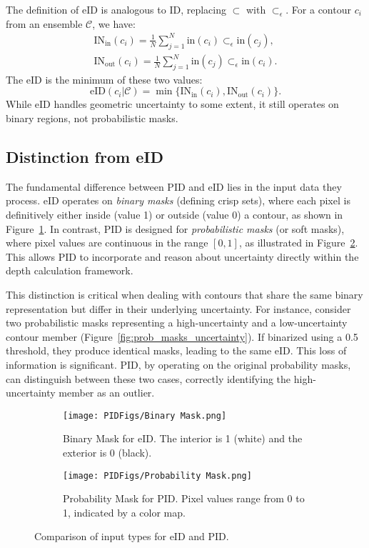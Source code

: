 \documentclass[review,journal]{vgtc}              %
\begin{document}
The definition of eID is analogous to ID, replacing $\subset$ with $\subset_{\epsilon}$. For a contour $c_i$ from an ensemble $\mathcal{C}$, we have:
\begin{gather}
\mathrm{IN_{in}}(c_i) = \frac{1}{N} \sum_{j=1}^{N} \mathrm{in}(c_i) \subset_{\epsilon} \mathrm{in}(c_j), \\
\mathrm{IN_{out}}(c_i) = \frac{1}{N} \sum_{j=1}^{N} \mathrm{in}(c_j) \subset_{\epsilon} \mathrm{in}(c_i).
\end{gather}
The eID is the minimum of these two values:
\begin{equation}
\mathrm{eID}(c_i|\mathcal{C}) = \min\{\mathrm{IN_{in}}(c_i), \mathrm{IN_{out}}(c_i)\}.
\end{equation}
While eID handles geometric uncertainty to some extent, it still operates on binary regions, not probabilistic masks.

\subsection{Distinction from eID}
The fundamental difference between PID and eID lies in the input data they process. eID operates on \emph{binary masks} (defining crisp sets), where each pixel is definitively either inside (value 1) or outside (value 0) a contour, as shown in Figure~\ref{fig:binary_mask}. In contrast, PID is designed for \emph{probabilistic masks} (or soft masks), where pixel values are continuous in the range $[0, 1]$, as illustrated in Figure~\ref{fig:prob_mask}. This allows PID to incorporate and reason about uncertainty directly within the depth calculation framework.

This distinction is critical when dealing with contours that share the same binary representation but differ in their underlying uncertainty. For instance, consider two probabilistic masks representing a high-uncertainty and a low-uncertainty contour member (Figure~\ref{fig:prob_masks_uncertainty}). If binarized using a 0.5 threshold, they produce identical masks, leading to the same eID. This loss of information is significant. PID, by operating on the original probability masks, can distinguish between these two cases, correctly identifying the high-uncertainty member as an outlier.

\begin{figure}[h!]
    \centering
    \begin{subfigure}[b]{0.45\textwidth}
        \centering
        \texttt{[image: PIDFigs/Binary Mask.png]}
        \caption{Binary Mask for eID. The interior is 1 (white) and the exterior is 0 (black).}
        \label{fig:binary_mask}
    \end{subfigure}
    \hfill
    \begin{subfigure}[b]{0.45\textwidth}
        \centering
        \texttt{[image: PIDFigs/Probability Mask.png]}
        \caption{Probability Mask for PID. Pixel values range from 0 to 1, indicated by a color map.}
        \label{fig:prob_mask}
    \end{subfigure}
    \caption{Comparison of input types for eID and PID.}
    \label{fig:masks}
\end{figure}
\end{document}
